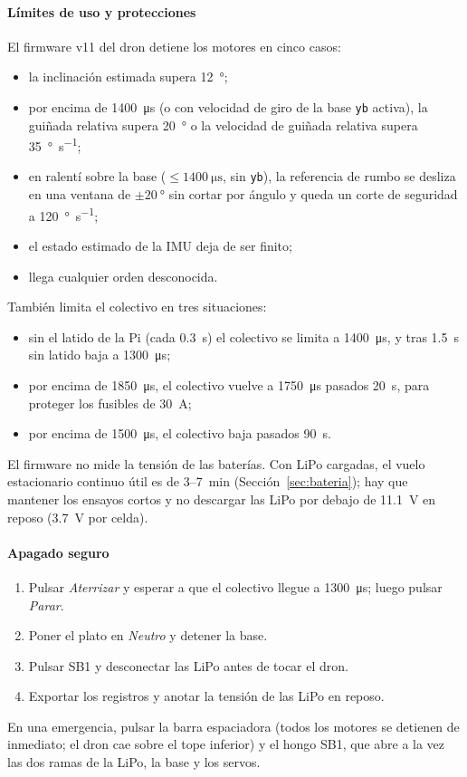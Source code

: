 \paragraph{Límites de uso y protecciones}
El firmware v11 del dron detiene los motores en cinco casos:
\begin{itemize}
  \item la inclinación estimada supera \SI{12}{\degree};
  \item por encima de \SI{1400}{\micro\second} (o con velocidad de giro de la base \texttt{yb} activa), la guiñada relativa supera \SI{20}{\degree} o la velocidad de guiñada relativa supera \SI{35}{\degree\per\second};
  \item en ralentí sobre la base ($\le\SI{1400}{\micro\second}$, sin \texttt{yb}), la referencia de rumbo se desliza en una ventana de $\pm\SI{20}{\degree}$ sin cortar por ángulo y queda un corte de seguridad a \SI{120}{\degree\per\second};
  \item el estado estimado de la IMU deja de ser finito;
  \item llega cualquier orden desconocida.
\end{itemize}
También limita el colectivo en tres situaciones:
\begin{itemize}
  \item sin el latido de la Pi (cada \SI{0.3}{\second}) el colectivo se limita a \SI{1400}{\micro\second}, y tras \SI{1.5}{\second} sin latido baja a \SI{1300}{\micro\second};
  \item por encima de \SI{1850}{\micro\second}, el colectivo vuelve a \SI{1750}{\micro\second} pasados \SI{20}{\second}, para proteger los fusibles de \SI{30}{\ampere};
  \item por encima de \SI{1500}{\micro\second}, el colectivo baja pasados \SI{90}{\second}.
\end{itemize}
El firmware no mide la tensión de las baterías. Con LiPo cargadas, el vuelo estacionario continuo útil es de 3--\SI{7}{\minute} (Sección~\ref{sec:bateria}); hay que mantener los ensayos cortos y no descargar las LiPo por debajo de \SI{11.1}{\volt} en reposo (\SI{3.7}{\volt} por celda).

\paragraph{Apagado seguro}
\begin{enumerate}
  \item Pulsar \emph{Aterrizar} y esperar a que el colectivo llegue a \SI{1300}{\micro\second}; luego pulsar \emph{Parar}.
  \item Poner el plato en \emph{Neutro} y detener la base.
  \item Pulsar SB1 y desconectar las LiPo antes de tocar el dron.
  \item Exportar los registros y anotar la tensión de las LiPo en reposo.
\end{enumerate}
En una emergencia, pulsar la barra espaciadora (todos los motores se detienen de inmediato; el dron cae sobre el tope inferior) y el hongo SB1, que abre a la vez las dos ramas de la LiPo, la base y los servos.

